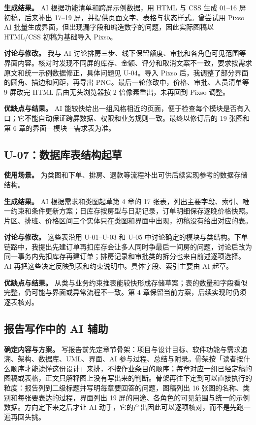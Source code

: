 \textbf{生成结果。} AI 根据功能清单和跨屏示例数据，用 HTML 与 CSS 生成 01--16 屏初稿，后来补出 17--19 屏，并提供页面文字、表格与状态样式。曾尝试用 Pixso AI 批量生成界面，但出现漏字段和编造数字的问题，因此实际图稿以 HTML/CSS 初稿为基础导入 Pixso。

\textbf{讨论与修改。} 我与 AI 讨论排房三步、线下保留额度、审批和各角色可见范围等界面内容。核对时发现不同屏的库存、金额、评分和取消文案不一致，要求按需求原文和统一示例数据修正，具体问题见 U-04。导入 Pixso 后，我调整了部分界面的圆角、描边和间距，再导出 PNG。最后一轮修改中，价格、审批、人员清单等 9 屏改完 HTML 后由无头浏览器按 2 倍像素重出，未再回到 Pixso 调整。

\textbf{优缺点与结果。} AI 能较快给出一组风格相近的页面，便于检查每个模块是否有入口；它不能自动保证跨屏数据、权限和业务规则一致。最终以修订后的 19 张图和第 6 章的界面—模块—需求表为准。

\subsection{U-07：数据库表结构起草}

\textbf{使用场景。} 为类图和下单、排房、退款等流程补出可供后续实现参考的数据存储结构。

\textbf{生成结果。} AI 根据需求和类图起草第 4 章的 17 张表，列出主要字段、索引、唯一约束和条件更新方案；日库存按房型与日期记录，订单明细保存逐晚价格快照。片区、排班、价格区间三个实体只在类图和界面中出现，初稿没有给出对应的表。

\textbf{讨论与修改。} 这些表沿用 U-01--U-03 和 U-05 中讨论确定的模块与类结构。下单链路中，我提出先建订单再扣库存会让多人同时争最后一间房的问题，讨论后改为同一事务内先扣库存再建订单；排房记录和审批类的拆分也来自前述逐项选择。AI 再把这些决定反映到表和约束说明中。具体字段、索引主要由 AI 起草。

\textbf{优缺点与结果。} 从类与业务约束推表能较快形成存储草案；表的数量和字段看似完整，仍可能与界面或异常流程不一致。第 4 章保留当前方案，后续实现时仍须逐表核对。

\subsection{报告写作中的 AI 辅助}

\textbf{确定内容与方案。} 写报告前先定章节骨架：项目与设计目标、软件功能与需求追溯、架构、数据库、UML、界面、AI 参与过程、总结与附录。骨架按「读者按什么顺序才能读懂这份设计」来排，不按作业条目的顺序；每章对应一组已经定稿的图稿或表格，正文只解释图上没有写出来的判断。骨架再往下定到可以直接执行的粒度：报告列到二级标题并写明每章要回答的问题，图稿列出 16 张图的名称、类别和每张要表达的过程，界面列出 19 屏的用途、各角色的可见范围与统一的示例数据。方向定下来之后才让 AI 动手，它的产出因此可以逐项核对，而不是先跑一遍再回头挑。

